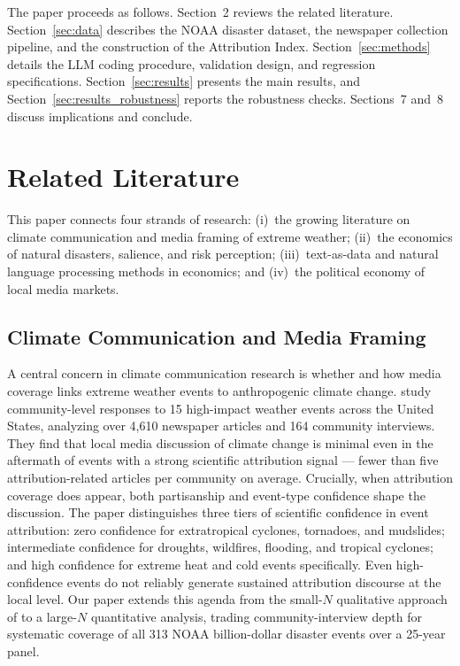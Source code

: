 \documentclass[12pt]{article}
\begin{document}
The paper proceeds as follows.  Section~2 reviews the related
literature.  Section~\ref{sec:data} describes the NOAA disaster
dataset, the newspaper collection pipeline, and the construction of the
Attribution Index.  Section~\ref{sec:methods} details the LLM coding
procedure, validation design, and regression specifications.
Section~\ref{sec:results} presents the main results, and
Section~\ref{sec:results_robustness} reports the robustness checks.
Sections~7 and~8 discuss implications and conclude.


\section{Related Literature}

This paper connects four strands of research: (i)~the growing literature
on climate communication and media framing of extreme weather; (ii)~the
economics of natural disasters, salience, and risk perception;
(iii)~text-as-data and natural language processing methods in economics;
and (iv)~the political economy of local media markets.

\subsection*{Climate Communication and Media Framing}

A central concern in climate communication research is whether and how
media coverage links extreme weather events to anthropogenic climate
change.  \citet{boudet2020} study community-level responses to 15
high-impact weather events across the United States, analyzing over
4,610 newspaper articles and 164 community interviews.  They find that
local media discussion of climate change is minimal even in the
aftermath of events with a strong scientific attribution signal ---
fewer than five attribution-related articles per community on average.
Crucially, when attribution coverage does appear, both partisanship
and event-type confidence shape the discussion.  The paper distinguishes
three tiers of scientific confidence in event attribution: zero
confidence for extratropical cyclones, tornadoes, and mudslides;
intermediate confidence for droughts, wildfires, flooding, and tropical
cyclones; and high confidence for extreme heat and cold events
specifically.  Even high-confidence events do not reliably generate
sustained attribution discourse at the local level.  Our paper extends
this agenda from the small-$N$ qualitative approach of
\citet{boudet2020} to a large-$N$ quantitative analysis, trading
community-interview depth for systematic coverage of all 313 NOAA
billion-dollar disaster events over a 25-year panel.
\end{document}
